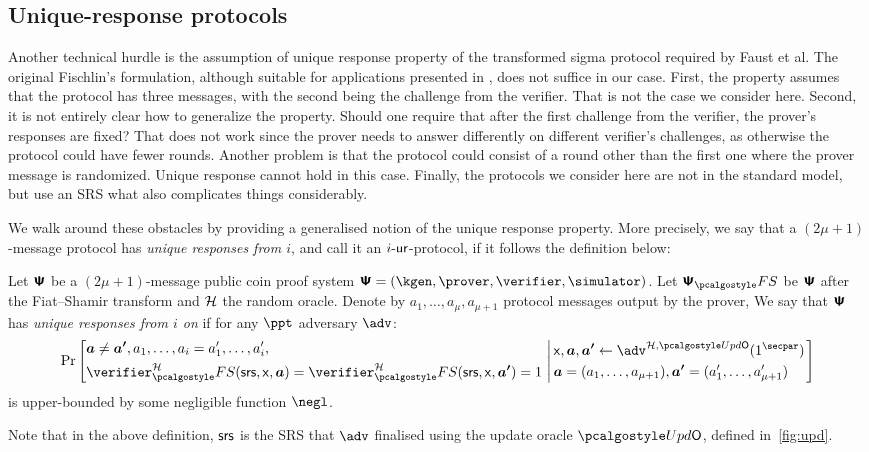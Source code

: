\subsection{Unique-response protocols}
Another technical hurdle is the assumption of unique response property 
of the transformed sigma protocol required by Faust et al. The original
Fischlin's formulation, although suitable for applications presented in
\cite{C:Fischlin05,INDOCRYPT:FKMV12}, does not suffice in our case. First,
the property assumes that the protocol has three messages, with the second being
the challenge from the verifier. That is not the case we consider here. Second,
it is not entirely clear how to generalize the property. Should one require that
after the first challenge from the verifier, the prover's responses are fixed?
That does not work since the prover needs to answer differently on different
verifier's challenges, as otherwise the protocol could have fewer
rounds. Another problem is that the protocol could consist of
a round other than the first one where the prover message is randomized.
Unique response cannot hold in this case. Finally, the protocols we
consider here are not in the standard model, but use an SRS
what also complicates things considerably.

We walk around these obstacles by providing a generalised notion of the unique
response property. More precisely, we say that a $(2\mu + 1)$-message protocol
has \emph{unique responses from $i$}, and call it an ${i\text{-}\mathsf{ur}}$-protocol, if it
follows the definition below:


\begin{definition}
	\label{def:wiuru}
	Let $\bm{\mathsf{\Psi}}$ be a $(2\mu + 1)$-message public coin proof system
	$\ps = (\kgen, \prover, \verifier, \simulator)$. Let $\proofsystem_\fs$ be
	$\bm{\mathsf{\Psi}}$ after the Fiat--Shamir transform and $\mathcal{H}$ the random
	oracle. Denote by $a_1, \ldots, a_{\mu}, a_{\mu + 1}$ protocol messages output
	by the prover, We say that $\bm{\mathsf{\Psi}}$ has \emph{unique responses from $i$
		on} if for any $\ppt$ adversary $\adv$:
	\[
	\Pr\left[
	\begin{aligned}
	& \vec{a} \neq \vec{a'}, a_1, \ldots, a_{i} = a'_1,
	\ldots, a'_{i}, \\
	& \verifier^\ro_\fs (\srs, \inp, \vec{a}) =
	\verifier^\ro_\fs(\srs, \inp, \vec{a'}) = 1  \\
	\end{aligned}
	\,\left|\,
	\begin{aligned}
	& \inp, \vec{a},  \vec{a'}  \gets \adv^{\ro, \initU}(1^\secpar) \\
& \vec{a} = (a_1, \ldots, a_{\mu + 1}), \vec{a'} = (a'_1, \ldots,
	a'_{\mu + 1})	
	\end{aligned}
	\right.\right]
	\]
	is upper-bounded by some negligible function $\negl$. 
\end{definition}
Note that in the above definition, $\mathsf{srs}$ is the SRS that $\advse$ finalised using the update oracle $\initU$, defined in~\cref{fig:upd}.

